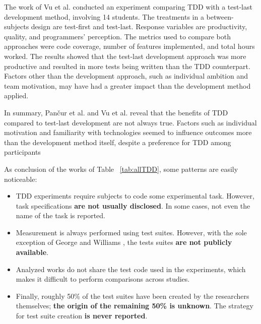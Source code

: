 The work of Vu et al. \cite{Vu2009} conducted an experiment comparing TDD with a test-last development method, involving 14 students. The treatments in a between-subjects design are test-first and test-last. Response variables are productivity, quality, and programmers' perception. The metrics used to compare both approaches were code coverage, number of features implemented, and total hours worked. The results showed that the test-last development approach was more productive and resulted in more tests being written than the TDD counterpart. Factors other than the development approach, such as individual ambition and team motivation, may have had a greater impact than the development method applied. %


In summary, Pan\v{c}ur et al. and Vu et al. \cite{Vu2009} reveal that the benefits of TDD compared to test-last development are not always true. Factors such as individual motivation and familiarity with technologies seemed to influence outcomes more than the development method itself, despite a preference for TDD among participants



As conclusion of the works of Table ~\ref{tab:allTDD}, some patterns are easily noticeable:

\begin{itemize}

\item TDD experiments require subjects to code some experimental task. However, task specifications \textbf{are not usually disclosed}. In some cases, not even the name of the task is reported.

\item Measurement is always performed using test suites. However, with the sole exception of George and Williams \cite{George2004}, the tests suites \textbf{are not publicly available}.

\item Analyzed works do not share the test code used in the experiments, which makes it difficult to perform comparisons across studies.

\item Finally, roughly 50\% of the test suites have been created by the researchers themselves; \textbf{the origin of the remaining 50\% is unknown}. The strategy for test suite creation \textbf{is never reported}.



\end{itemize}

